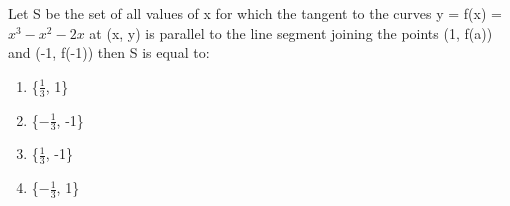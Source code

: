 \item Let S be the set of all values of x for which the tangent to the curves y = f(x) = $x^3 - x^2 - 2x$ at (x, y) is parallel to the line segment joining the points (1, f(a)) and (-1, f(-1)) then S is equal to: 
\begin{enumerate}
\item \{$\frac{1}{3}$, 1\}
\item \{$-\frac{1}{3}$, -1\}
\item \{$\frac{1}{3}$, -1\}
\item \{$-\frac{1}{3}$, 1\}
\end{enumerate}
































